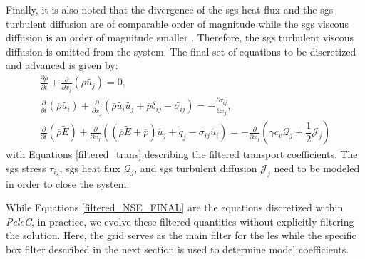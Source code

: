 Finally, it is also noted that the divergence of the \gls{sgs} heat flux and the \gls{sgs} turbulent diffusion are of comparable order of magnitude while the \gls{sgs} viscous diffusion is an order of magnitude smaller \cite{LES_Comp}. Therefore, the \gls{sgs} turbulent viscous diffusion is omitted from the system. The final set of equations to be discretized and advanced is given by:  
\begin{subequations} \label{filtered_NSE_FINAL}
\begin{align}
  \frac{\partial\overline{\rho}}{\partial t} + \frac{\partial }{\partial x_j} \left( \overline{\rho}\widetilde{ u_j} \right) = 0, \label{NSE_mass_FINAL} \\
  \frac{\partial}{\partial t} \left( \overline{\rho}\widetilde{ u_i }\right) + \frac{\partial}{\partial x_j} \left(\overline{\rho}\widetilde{ u_i} \widetilde{u_j} + \overline{p }\delta_{ij} - \widetilde{\sigma_{ij}} \right) = - \frac{\partial \tau_{ij}}{\partial x_j}, \label{NSE_mom_FINAL}  \\
  \frac{\partial}{\partial t} \left( \overline{\rho}\widetilde{ E} \right) + \frac{\partial}{\partial x_j} \left(\left( \overline{\rho}\widetilde{ E}+\overline{p} \right)\widetilde{u_j} + \widetilde{q_j} - \widetilde{\sigma_{ij}}\widetilde{ u_i}\right) = - \frac{\partial}{\partial x_j } \left( \gamma c_v \mathcal{Q}_j + \dfrac{1}{2} \mathcal{J}_j \right)  \label{NSE_E_FINAL}
\end{align}
\end{subequations}
with Equations \eqref{filtered_trans} describing the filtered transport coefficients. The \gls{sgs} stress $\tau_{ij}$, \gls{sgs} heat flux $\mathcal{Q}_{j}$, and \gls{sgs} turbulent diffusion $\mathcal{J}_j$ need to be modeled in order to close the system. 

While Equations \eqref{filtered_NSE_FINAL} are the equations discretized within \textit{PeleC}, in practice, we evolve these filtered quantities without explicitly filtering the solution. Here, the grid serves as the main filter for the \gls{les} while the specific box filter described in the next section is used to determine model coefficients. 


